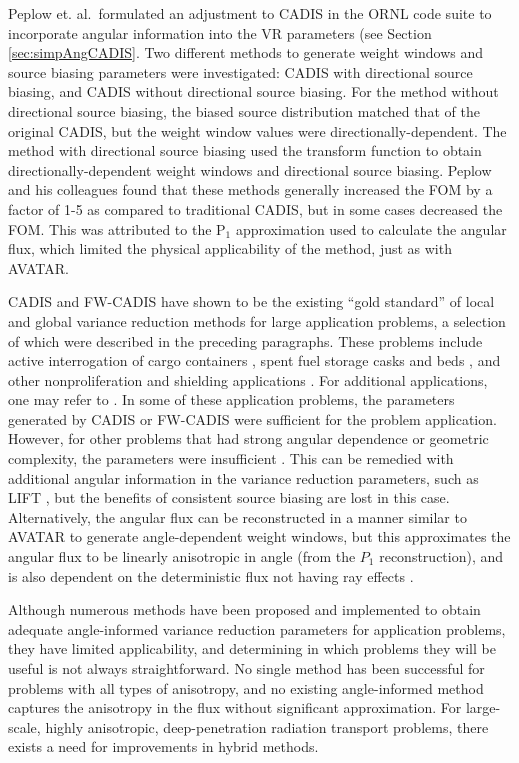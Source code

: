 Peplow et. al.\ formulated an adjustment to CADIS in the ORNL
code suite \cite{peplow_consistent_2012} to incorporate angular information into
the VR parameters (see Section \ref{sec:simpAngCADIS}.
Two different
methods to generate weight windows and source biasing parameters
were investigated:
CADIS with directional source biasing, and CADIS without directional source
biasing.
For the method without
directional source biasing, the biased source distribution matched that of the
original CADIS, but the weight window values were directionally-dependent. The
method with directional source biasing used the transform function to obtain
directionally-dependent weight windows and directional source biasing.
Peplow and his colleagues found
that these methods generally increased the FOM by a factor of 1-5 as compared to
traditional CADIS, but in some
cases decreased the FOM. This was attributed to the P$_1$ approximation used
to calculate the angular flux, which limited the physical applicability of the
method, just as with AVATAR.

CADIS and FW-CADIS have shown to be the existing ``gold standard'' of local and
global variance reduction methods for large application problems, a selection
of which were described in the preceding paragraphs.
These problems include active interrogation of cargo containers
\cite{mosher_automated_2009}, spent fuel storage casks \cite{chen_surface_2011,
radulescu_dose_2013}
and beds \cite{sheu_dose_2011}, and other nonproliferation and shielding
applications
\cite{somasundaram_implementation_2013}. For additional
applications, one may refer to \cite{wagner_review_2011}.
In some of these application problems, the
parameters generated by CADIS or FW-CADIS were sufficient for the problem
application. However, for other problems that had
strong angular dependence or geometric
complexity, the parameters were insufficient \cite{chen_surface_2011,
somasundaram_implementation_2013, peplow_consistent_2012}.
This can be remedied with additional angular
information in the variance reduction parameters, such as LIFT
\cite{somasundaram_implementation_2013}, but the benefits of consistent source
biasing are lost in this case. Alternatively, the angular flux can be
reconstructed in a manner similar to AVATAR
\cite{sweezy_automated_2005, peplow_consistent_2012} to generate angle-dependent
weight windows, but this approximates the angular flux to be linearly
anisotropic in angle
(from the $P_1$ reconstruction), and is also dependent on
the deterministic flux not having ray effects \cite{sweezy_automated_2005}.

Although numerous methods have been
proposed and implemented to obtain adequate angle-informed variance reduction
parameters for application problems, they have limited applicability,
and determining in which problems they will be
useful is not always straightforward. No single method has been successful
for problems with all types of anisotropy, and no existing angle-informed method
captures the anisotropy in the flux without significant approximation. For
large-scale, highly anisotropic, deep-penetration radiation transport problems,
there exists a need for improvements in hybrid methods.

